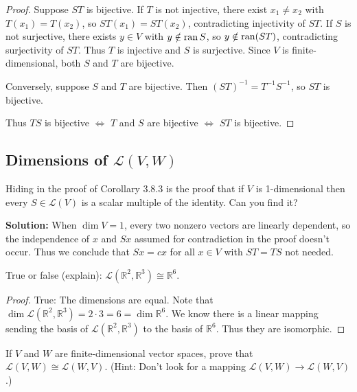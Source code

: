 \begin{proof}
    Suppose $ST$ is bijective.
    If $T$ is not injective, there exist $x_1 \ne x_2$ with $T(x_1) = T(x_2)$,
    so $ST(x_1) = ST(x_2)$, contradicting injectivity of $ST$.
    If $S$ is not surjective, there exists $y \in V$ with $y \notin \operatorname{ran} S$,
    so $y \notin \operatorname{ran}(ST)$, contradicting surjectivity of $ST$.
    Thus $T$ is injective and $S$ is surjective. Since $V$ is finite-dimensional,
    both $S$ and $T$ are bijective.

    Conversely, suppose $S$ and $T$ are bijective. Then $(ST)^{-1} = T^{-1}S^{-1}$,
    so $ST$ is bijective.

    Thus $TS$ is bijective $\Leftrightarrow$ $T$ and $S$ are bijective $\Leftrightarrow$ $ST$ is bijective.
\end{proof}

\subsection{Dimensions of $\mathcal{L}(V, W)$}

\begin{tcolorbox}[title=Exercise 1, breakable]
    Hiding in the proof of Corollary 3.8.3 is the proof that if $V$ is 
    1-dimensional then every $S \in \mathcal{L}(V)$ is a scalar multiple of the identity.
    Can you find it?
\end{tcolorbox}

\textbf{Solution: } When $\dim V = 1$, every two nonzero vectors are linearly dependent, 
so the independence of $x$ and $Sx$ assumed for contradiction in the proof doesn't occur.
Thus we conclude that $Sx = cx$ for all $x \in V$ with $ST = TS$ not needed.

\begin{tcolorbox}[title=Exercise 2, breakable]
    True or false (explain): $\mathcal{L}(\mathbb{R}^2, \mathbb{R}^3) \cong \mathbb{R}^6$.
\end{tcolorbox}

\begin{proof}
    True:
    The dimensions are equal.
    Note that $\dim \mathcal{L}(\mathbb{R}^2, \mathbb{R}^3) = 2 \cdot 3 = 6 = \dim \mathbb{R}^6$.
    We know there is a linear mapping sending the basis of 
        $\mathcal{L}(\mathbb{R}^2, \mathbb{R}^3)$ to the basis 
        of $\mathbb{R}^6$.
    Thus they are isomorphic.
\end{proof}

\begin{tcolorbox}[title=Exercise 3, breakable]
    If $V$ and $W$ are finite-dimensional vector spaces, prove that 
    $\mathcal{L}(V, W) \cong \mathcal{L}(W, V)$. (Hint: Don't look for a mapping 
    $\mathcal{L}(V, W) \to \mathcal{L}(W, V)$.)
\end{tcolorbox}

